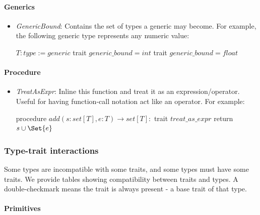 \paragraph{Generics}
\begin{itemize}
    \item \textit{GenericBound}: Contains the set of types a generic may become. For example, the following generic type represents any numeric value:
    \begin{algorithmic}
      \State $T: type := generic$
      \State \quad trait $generic\_bound = int$
      \State \quad trait $generic\_bound = float$
    \end{algorithmic}
\end{itemize}

\paragraph{Procedure}
\begin{itemize}
    \item \textit{TreatAsExpr}: Inline this function and treat it as an expression/operator. Useful for having function-call notation act like an operator. For example:
    \begin{algorithmic}
      \State procedure $add(s: set[T], e: T) \rightarrow set[T]:$
      \State \quad trait $treat\_as\_expr$
      \State \quad return $s \cup \Set{e}$
    \end{algorithmic}
\end{itemize}

\subsubsection{Type-trait interactions}
Some types are incompatible with some traits, and some types must have some traits. We provide tables showing compatibility between traits and types. A double-checkmark means the trait is always present - a base trait of that type.

\paragraph{Primitives}


